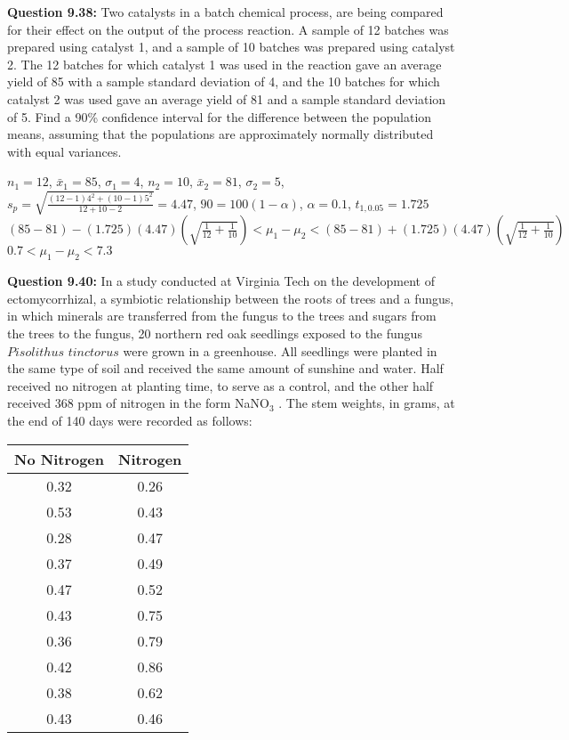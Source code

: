 \documentclass{article}
\begin{document}
\textbf{Question 9.38:}
Two catalysts in a batch chemical process, are
being compared for their effect on the output of the
process reaction. A sample of 12 batches was prepared
using catalyst 1, and a sample of 10 batches was 
prepared using catalyst 2. The 12 batches for which 
catalyst 1 was used in the reaction gave an average yield
of 85 with a sample standard deviation of 4, and the
10 batches for which catalyst 2 was used gave an average 
yield of 81 and a sample standard deviation of 5.
Find a 90\% confidence interval for the difference 
between the population means, assuming that the 
populations are approximately normally distributed with
equal variances.
\begin{description}
    \item $n_1 = 12$, $\bar{x}_1=85$, $\sigma_1=4$, $n_2=10$, $\bar{x}_2=81$,
    $\sigma_2=5$, $s_p=\sqrt{\frac{(12-1)4^2+(10-1)5^2}{12+10-2}}=4.47$, $90=100(1-\alpha)$, 
    $\alpha=0.1$, $t_{1,0.05}=1.725$\\
    $(85-81)-(1.725)(4.47)(\sqrt{\frac{1}{12}+\frac{1}{10}}) < \mu_1 - \mu_2 <
    (85-81)+(1.725)(4.47)(\sqrt{\frac{1}{12}+\frac{1}{10}}) $\\
    \boldmath$0.7 < \mu_1 - \mu_2 < 7.3$
\end{description}
\textbf{Question 9.40:}
In a study conducted at Virginia Tech on the
development of ectomycorrhizal, a symbiotic relationship 
between the roots of trees and a fungus, in which
minerals are transferred from the fungus to the trees
and sugars from the trees to the fungus, 20 northern
red oak seedlings exposed to the fungus $Pisolithus$ $tinctorus$ 
were grown in a greenhouse. All seedlings were planted in 
the same type of soil and received the same amount of 
sunshine and water. Half received no nitrogen at planting 
time, to serve as a control, and the other half received 
368 ppm of nitrogen in the form NaNO$_3$ . The stem weights, 
in grams, at the end of 140 days were recorded as follows:
\begin{center}
\begin{tabular}{ c  c }
    No Nitrogen & Nitrogen\\
    \hline
    0.32 & 0.26 \\ 
    0.53 & 0.43 \\
    0.28 & 0.47 \\
    0.37 & 0.49 \\
    0.47 & 0.52 \\
    0.43 & 0.75 \\
    0.36 & 0.79 \\
    0.42 & 0.86 \\
    0.38 & 0.62 \\
    0.43 & 0.46 \\
    \hline
\end{tabular}
\end{center}
\end{document}
